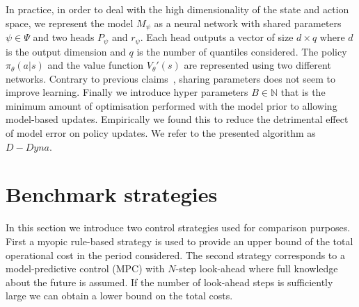 \documentclass{article}
\begin{document}
        In practice, in order to deal with the high dimensionality of the state and action space, we represent the model $M_{\psi}$ as a neural network with shared parameters $\psi \in \Psi$ and two heads $P_\psi$ and $r_\psi$. Each head outputs a vector of size $d \times q$ where $d$ is the output dimension and $q$ is the number of quantiles considered.
        The policy $\pi_\theta(a\rvert s)$ and the value function $V_\theta'(s)$ are represented using two different networks. Contrary to previous claims~\cite{Schulman2017}, sharing parameters does not seem to improve learning.
        Finally we introduce hyper parameters $B \in \mathbb{N}$ that is the minimum amount of optimisation performed with the model prior to allowing model-based updates. Empirically we found this to reduce the detrimental effect of model error on policy updates. We refer to the presented algorithm as $D-Dyna$.
        
   \section{Benchmark strategies} \label{sec: Bechmarks}

In this section we introduce two control strategies used for comparison purposes. First a myopic rule-based strategy is used to provide an upper bound of the total operational cost in the period considered. The second strategy corresponds to a model-predictive control (MPC) with $N$-step look-ahead where full knowledge about the future is assumed. If the number of look-ahead steps is sufficiently large we can obtain a lower bound on the total costs.
\end{document}
